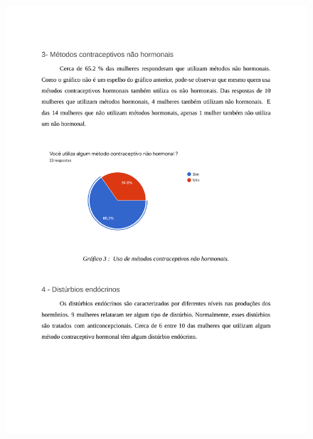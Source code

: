 \begin{apendicesenv}
    \begin{figure}[h]
        \centering
        \includegraphics[keepaspectratio=true,scale=0.7]{figuras/Tab3.pdf}
    \end{figure}
    

\end{apendicesenv}
